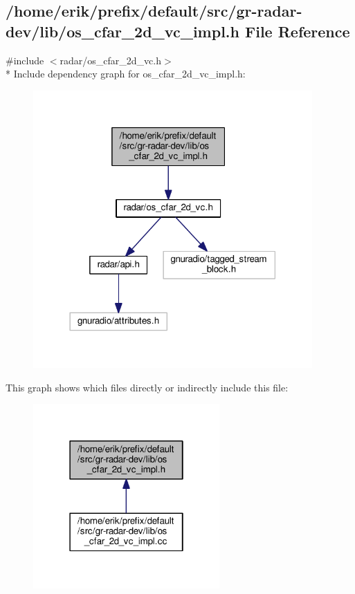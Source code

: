 \subsection{/home/erik/prefix/default/src/gr-\/radar-\/dev/lib/os\+\_\+cfar\+\_\+2d\+\_\+vc\+\_\+impl.h File Reference}
\label{os__cfar__2d__vc__impl_8h}
{\ttfamily \#include $<$radar/os\+\_\+cfar\+\_\+2d\+\_\+vc.\+h$>$}\\*
Include dependency graph for os\+\_\+cfar\+\_\+2d\+\_\+vc\+\_\+impl.\+h\+:
\nopagebreak
\begin{figure}[H]
\begin{center}
\leavevmode
\includegraphics[width=302pt]{d5/d4b/os__cfar__2d__vc__impl_8h__incl}
\end{center}
\end{figure}
This graph shows which files directly or indirectly include this file\+:
\nopagebreak
\begin{figure}[H]
\begin{center}
\leavevmode
\includegraphics[width=202pt]{d8/def/os__cfar__2d__vc__impl_8h__dep__incl}
\end{center}
\end{figure}
